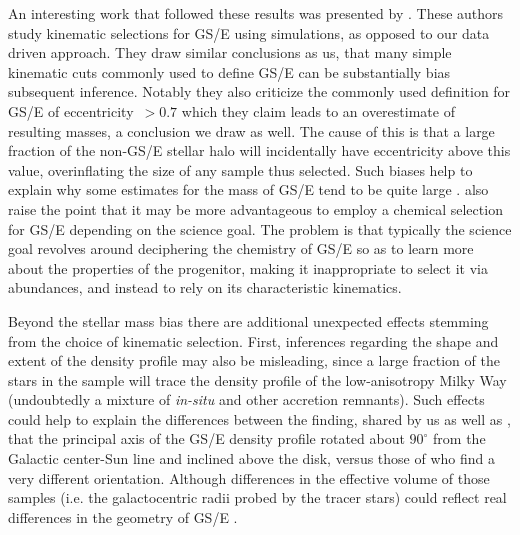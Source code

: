 An interesting work that followed these results was presented by \textcite{carrillo23}. These authors study kinematic selections for GS/E using simulations, as opposed to our data driven approach. They draw similar conclusions as us, that many simple kinematic cuts commonly used to define GS/E can be substantially bias subsequent inference. Notably they also criticize the commonly used definition for GS/E of eccentricity~$> 0.7$ which they claim leads to an overestimate of resulting masses, a conclusion we draw as well. The cause of this is that a large fraction of the non-GS/E stellar halo will incidentally have eccentricity above this value, overinflating the size of any sample thus selected. Such biases help to explain why some estimates for the mass of GS/E tend to be quite large \parencite[e.g.][ who use this eccentricity cut to define GS/E]{han22}. \textcite{carrillo23} also raise the point that it may be more advantageous to employ a chemical selection for GS/E depending on the science goal. The problem is that typically the science goal revolves around deciphering the chemistry of GS/E so as to learn more about the properties of the progenitor, making it inappropriate to select it via abundances, and instead to rely on its characteristic kinematics.

Beyond the stellar mass bias there are additional unexpected effects stemming from the choice of kinematic selection. First, inferences regarding the shape and extent of the density profile may also be misleading, since a large fraction of the stars in the sample will trace the density profile of the low-anisotropy Milky Way (undoubtedly a mixture of \textit{in-situ} and other accretion remnants). Such effects could help to explain the differences between the finding, shared by us as well as \textcite{iorio21}, that the principal axis of the GS/E density profile rotated about $90^\circ$ from the Galactic center-Sun line and inclined above the disk, versus those of \textcite{han22} who find a very different orientation. Although differences in the effective volume of those samples (i.e. the galactocentric radii probed by the tracer stars) could reflect real differences in the geometry of GS/E \textcite[see][ for an example of this in the outer halo]{chandra23}. 

